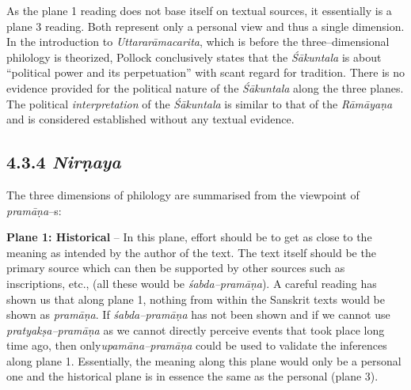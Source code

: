 As the plane 1 reading does not base itself on textual sources, it essentially is a plane 3 reading. Both represent only a personal view and thus a single dimension. In the introduction to \textit{Uttararāmacarita}, which is before the three–dimensional philology is theorized, Pollock conclusively states that the \textit{Śākuntala }is about “political power and its perpetuation” with scant regard for tradition. There is no evidence provided for the political nature of the \textit{Śākuntala} along the three planes. The political \textit{interpretation} of the \textit{Śākuntala }is similar to that of the \textit{Rāmāyaṇa} and is considered established without any textual evidence.

\vspace{-.3cm}

\subsection*{4.3.4 {\it {\bfseries Nirṇaya}}}

The three dimensions of philology are summarised from the viewpoint of \textit{pramāṇa}–s:

\textbf{Plane 1: Historical} – In this plane, effort should be to get as close to the meaning as intended by the author of the text. The text itself should be the primary source which can then be supported by other sources such as inscriptions, etc., (all these would be \textit{śabda–pramāṇa}). A careful reading has shown us that along plane 1, nothing from within the Sanskrit texts would be shown as \textit{pramāṇa}. If \textit{śabda–pramāṇa} has not been shown and if we cannot use \textit{pratyakṣa–pramāṇa} as we cannot directly perceive events that took place long time ago, then only\textit{upamāna–pramāṇa} could be used to validate the inferences along plane 1. Essentially, the meaning along this plane would only be a personal one and the historical plane is in essence the same as the personal (plane 3).


